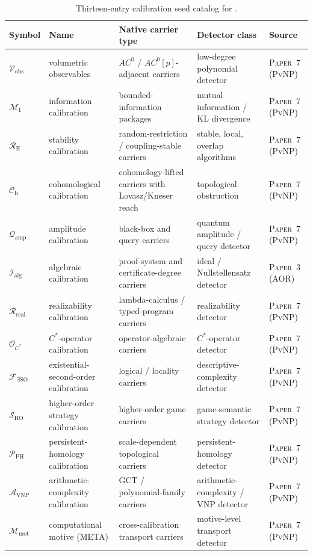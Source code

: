 \documentclass[11pt]{article}
\newcommand{\PaperAOR}{\textsc{Paper~3 (AOR)}}
\newcommand{\PaperPvNP}{\textsc{Paper~7 (PvNP)}}
\newcommand{\Cvobs}{\mathcal{V}_{\text{obs}}}
\newcommand{\CMI}{\mathcal{M}_{\text{I}}}
\newcommand{\CRE}{\mathcal{R}_{\text{E}}}
\newcommand{\CCh}{\mathcal{C}_{\text{h}}}
\newcommand{\CQamp}{\mathcal{Q}_{\text{amp}}}
\newcommand{\CIalg}{\mathcal{I}_{\text{alg}}}
\newcommand{\CRreal}{\mathcal{R}_{\text{real}}}
\newcommand{\COCstar}{\mathcal{O}_{C^*}}
\newcommand{\CFexistsSO}{\mathcal{F}_{\exists \mathrm{SO}}}
\newcommand{\CSHO}{\mathcal{S}_{\mathrm{HO}}}
\newcommand{\CPPH}{\mathcal{P}_{\mathrm{PH}}}
\newcommand{\CAVNP}{\mathcal{A}_{\mathrm{VNP}}}
\newcommand{\CMmot}{\mathcal{M}_{\text{mot}}}
\theoremstyle{definition}
\begin{document}
\begin{table}[H]
  \centering
  \caption{Thirteen-entry calibration seed catalog for .}
  \label{tab:calibration:seed}
  \scriptsize
  \renewcommand{\arraystretch}{1.06}
  \begin{tabularx}{\textwidth}{@{}>{\raggedright\arraybackslash}p{}>{\raggedright\arraybackslash}p{}>{\raggedright\arraybackslash}X>{\raggedright\arraybackslash}p{}>{\raggedright\arraybackslash}p{}@{}}
    \toprule
    Symbol & Name & Native carrier type & Detector class & Source \\
    \midrule
    \(\Cvobs\) & volumetric observables & \(AC^0\) / \(AC^0[p]\)-adjacent carriers & low-degree polynomial detector & \PaperPvNP \\
    \(\CMI\) & information calibration & bounded-information packages & mutual information / KL divergence & \PaperPvNP \\
    \(\CRE\) & stability calibration & random-restriction / coupling-stable carriers & stable, local, overlap algorithms & \PaperPvNP \\
    \(\CCh\) & cohomological calibration & cohomology-lifted carriers with Lovasz/Kneser reach & topological obstruction & \PaperPvNP \\
    \(\CQamp\) & amplitude calibration & black-box and query carriers & quantum amplitude / query detector & \PaperPvNP \\
    \(\CIalg\) & algebraic calibration & proof-system and certificate-degree carriers & ideal / Nullstellensatz detector & \PaperAOR\ \cite{Tsiokos2026AOR} \\
    \(\CRreal\) & realizability calibration & lambda-calculus / typed-program carriers & realizability detector & \PaperPvNP \\
    \(\COCstar\) & \(C^*\)-operator calibration & operator-algebraic carriers & \(C^*\)-operator detector & \PaperPvNP \\
    \(\CFexistsSO\) & existential-second-order calibration & logical / locality carriers & descriptive-complexity detector & \PaperPvNP \\
    \(\CSHO\) & higher-order strategy calibration & higher-order game carriers & game-semantic strategy detector & \PaperPvNP \\
    \(\CPPH\) & persistent-homology calibration & scale-dependent topological carriers & persistent-homology detector & \PaperPvNP \\
    \(\CAVNP\) & arithmetic-complexity calibration & GCT / polynomial-family carriers & arithmetic-complexity / VNP detector & \PaperPvNP \\
    \(\CMmot\) & computational motive (META) & cross-calibration transport carriers & motive-level transport detector & \PaperPvNP \\
    \bottomrule
  \end{tabularx}
\end{table}
 
\end{document}
